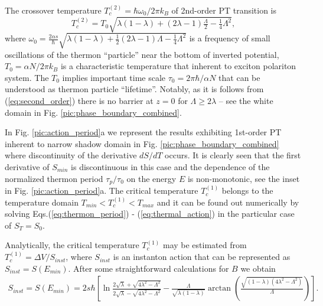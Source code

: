 \documentclass[aps, pre, preprint, groupedaddress, superscriptaddress, showkeys, showpacs] {revtex4-1}
\begin{document}
The crossover temperature $T_{c}^{(2)} = \hbar \omega_0/ 2 \pi k_B$ of 2nd-order PT transition  is 
%
\begin{equation}
T_{c}^{(2)} = T_{0} \sqrt{\lambda (1 - \lambda) + (2 \lambda - 1) \tfrac{\Lambda}{2} - \tfrac{1}{4} \Lambda^2},
\label{eq:second_order}
\end{equation}
%
where  $\omega_0 = \frac{2 \alpha s}{\hbar} \sqrt{\lambda (1 - \lambda) + \tfrac{1}{2} (2 \lambda - 1) \Lambda - \tfrac{1}{4} \Lambda^2}$ is a frequency of small oscillations of the thermon ``particle'' near the bottom of inverted potential,  $T_{0}=\alpha N / 2\pi k_B$ is a characteristic temperature that inherent to exciton polariton system.  The $T_{0}$  implies important time scale $\tau_0=2\pi\hbar/ \alpha N$ that can be understood as thermon particle ``lifetime''. Notably, as it is follows from (\ref{eq:second_order}) there is no barrier at $z = 0$ for $\Lambda \ge 2\lambda$ -- see the white domain in Fig. \ref{pic:phase_boundary_combined}.
 
In Fig. \ref{pic:action_period}a we represent the results exhibiting 1st-order PT inherent to narrow shadow domain in Fig. \ref{pic:phase_boundary_combined} where discontinuity of the derivative $dS / dT$ occurs.
It is clearly seen that the first derivative of $S_{min}$ is discontinuous in this case and the dependence of the normalized thermon period  $\tau_p / \tau_0$ on the energy $E$ is non-monotonic, see the inset in Fig. \ref{pic:action_period}a.
The critical temperature $T_{c}^{(1)}$ belongs to the temperature domain $T_{min} < T_{c}^{(1)} < T_{max}$ and it can be found out numerically by solving Eqs.(\ref{eq:thermon_period}) - (\ref{eq:thermal_action}) in the particular case of $S_T = S_0$.
 
Analytically, the critical temperature $T_{c}^{(1)}$ may be estimated from $T_{c}^{(1)} = \Delta V / S_{inst}$, where $S_{inst}$ is an instanton action that can be represented as $S_{inst} = S(E_{min})$.
After some straightforward calculations for $B$ we obtain
%
\begin{equation}
\begin{array}{c}
S_{inst} = S(E_{min}) = 2 s \hbar \left[ \ln \frac{2 \sqrt{\lambda} + \sqrt{4 \lambda^2 - \Lambda^2}}{2 \sqrt{\lambda} - \sqrt{4 \lambda^2 - \Lambda^2}} - \frac{\Lambda}{\sqrt{\lambda (1 - \lambda)}} \arctan \left( \frac{\sqrt{(1 - \lambda) (4 \lambda^2 - \Lambda^2)}}{\Lambda} \right) \right].
\end{array}
\label{eq:B_action}
\end{equation}
%
\end{document}
